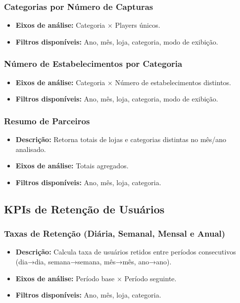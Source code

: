 \documentclass[12pt]{article}
\begin{document}
\subsubsection{Categorias por Número de Capturas}
\begin{itemize}
    \item \textbf{Eixos de análise:} Categoria × Players únicos.
    \item \textbf{Filtros disponíveis:} Ano, mês, loja, categoria, modo de exibição.
\end{itemize}

\subsubsection{Número de Estabelecimentos por Categoria}
\begin{itemize}
    \item \textbf{Eixos de análise:} Categoria × Número de estabelecimentos distintos.
    \item \textbf{Filtros disponíveis:} Ano, mês, loja, categoria, modo de exibição.
\end{itemize}

\subsubsection{Resumo de Parceiros}
\begin{itemize}
    \item \textbf{Descrição:} Retorna totais de lojas e categorias distintas no mês/ano analisado.
    \item \textbf{Eixos de análise:} Totais agregados.
    \item \textbf{Filtros disponíveis:} Ano, mês, loja, categoria.
\end{itemize}

\subsection{KPIs de Retenção de Usuários}
\subsubsection{Taxas de Retenção (Diária, Semanal, Mensal e Anual)}
\begin{itemize}
    \item \textbf{Descrição:} Calcula taxa de usuários retidos entre períodos consecutivos (dia→dia, semana→semana, mês→mês, ano→ano).
    \item \textbf{Eixos de análise:} Período base × Período seguinte.
    \item \textbf{Filtros disponíveis:} Ano, mês, loja, categoria.
\end{itemize}
\end{document}
